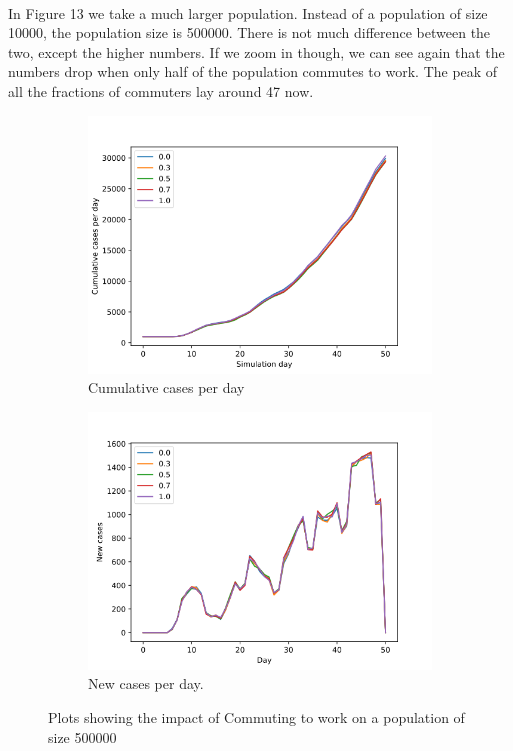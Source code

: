 \documentclass[runningheads]{llncs}
\begin{document}
\paragraph{} In Figure 13 we take a much larger population. Instead of a population of size 10000, the population size is 500000. There is not much difference between the two, except the higher numbers. If we zoom in though, we can see again that the numbers drop when only half of the population commutes to work. The peak of all the fractions of commuters lay around 47 now. 


\begin{figure}[h!]
	\centering
	\begin{subfigure}[b]{0.7\linewidth}
		\includegraphics[width=\textwidth]{population500000_Cumulative.png}
		\caption{Cumulative cases per day} 
	\end{subfigure}
	\begin{subfigure}[b]{0.7\linewidth}
		\includegraphics[width=\textwidth]{population500000_cases_per_day.png}
		\caption{New cases per day.} 
	\end{subfigure}
	\caption{Plots showing the impact of Commuting to work on a population of size 500000}
	\label{VaccinePlot}
\end{figure}
\end{document}
